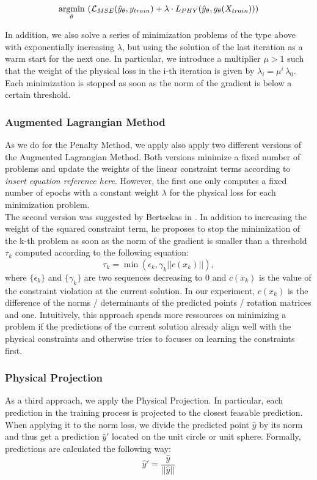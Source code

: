 \[\underset{\theta}{\operatorname*{argmin}} \,\, (\mathcal{L}_{MSE}(\hat{y}_\theta, y_{train}) + \lambda \cdot L_{PHY}(\hat{y}_\theta, g_\theta(X_{train})))\]

In addition, we also solve a series of minimization problems of the type above with exponentially increasing $\lambda$, but using the solution of the last iteration as a warm start for the next one. In particular, we introduce a multiplier $\mu > 1$ such that the weight of the physical loss in the i-th iteration is given by $\lambda_i = \mu^i \, \lambda_0$. Each minimization is stopped as soon as the norm of the gradient is below a certain threshold.

\subsubsection{Augmented Lagrangian Method}
\label{exp:alm}
As we do for the Penalty Method, we apply also apply two different versions of the Augmented Lagrangian Method. Both versions minimize a fixed number of problems and update the weights of the linear constraint terms according to \textit{insert equation reference here}. However, the first one only computes a fixed number of epochs with a constant weight $\lambda$ for the physical loss for each minimization problem.\\
\indent The second version was suggested by Bertsekas in \cite{Yurkiewicz1985ConstrainedOA}. In addition to increasing the weight of the squared constraint term, he proposes to stop the minimization of the k-th problem as soon as the norm of the gradient is smaller than a threshold $\tau_k$ computed according to the following equation:
\[\tau_k = \min(\epsilon_k, \gamma_k ||c(x_k)||), \]
where $\{\epsilon_k\}$ and $\{\gamma_k \}$ are two sequences decreasing to 0 and $c(x_k)$ is the value of the constraint violation at the current solution. In our experiment, $c(x_k)$ is the difference of the norms / determinants of the predicted points / rotation matrices and one. Intuitively, this approach spends more ressources on minimizing a problem if the predictions of the current solution already align well with the physical constraints and otherwise tries to focuses on learning the constraints first.

\subsubsection{Physical Projection}

As a third approach, we apply the Physical Projection. In particular, each prediction in the training process is projected to the closest feasable prediction. When applying it to the norm loss, we divide the predicted point $\hat{y}$ by its norm and thus get a prediction $\hat{y}'$ located on the unit circle or unit sphere. Formally, predictions are calculated the following way:
\[\hat{y}' = \frac{\hat{y}}{||\hat{y}||} \]

